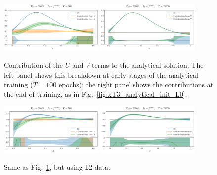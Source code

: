 \begin{figure}[ht!]
    \centering
    \includegraphics[width=0.45\textwidth]{plots/analytical_solution/u_v_decomposition/evolution_u_v_100_L0.pdf}
    \includegraphics[width=0.45\textwidth]{plots/analytical_solution/u_v_decomposition/evolution_u_v_20000_L0.pdf}
    \caption{Contribution of the $U$ and $V$ terms to the analytical solution. The left
    panel shows this breakdown at early stages of the analytical training
    ($T=100$ epochs); the right panel shows the contributions at the end of
    training, as in Fig.~\ref{fig:xT3_analytical_init_L0}.}
    \label{fig:xT3_u_v_contributions_L0}
  \end{figure}

  \begin{figure}[ht!]
    \centering
    \includegraphics[width=0.45\textwidth]{plots/analytical_solution/u_v_decomposition/evolution_u_v_100_L2.pdf}
    \includegraphics[width=0.45\textwidth]{plots/analytical_solution/u_v_decomposition/evolution_u_v_20000_L2.pdf}
    \caption{Same as Fig.~\ref{fig:xT3_u_v_contributions_L0}, but using L2 data.}
    \label{fig:xT3_u_v_contributions_L2}
  \end{figure}


